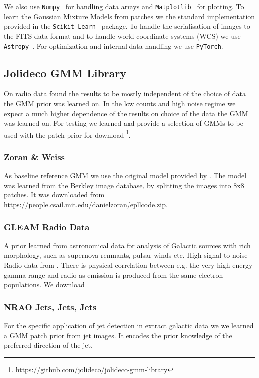 \documentclass[twocolumn]{aastex631}
\begin{document}
    We also use \texttt{Numpy}~\citep{Numpy2020} for handling data arrays and
    \texttt{Matplotlib}~\citep{Hunter2007} for plotting.
    To learn the Gaussian Mixture Models from patches we the standard implementation
    provided in the \texttt{Scikit-Learn}~\citep{Skimage2014} package. To handle the 
    serialisation of images to the FITS data format and to handle world coordinate
    systems (WCS) we use \texttt{Astropy}~\citep{Astropy2018}.
    For optimization and internal data handling we use \texttt{PyTorch}.

    \subsection{Jolideco GMM Library}
    On radio data \cite{Bouman2016} found the results to be mostly independent 
    of the choice of data the GMM prior was learned on. In the low counts and high
    noise regime we expect a much higher dependence of the results on choice of the
    data the GMM was learned on. For testing we learned and provide a selection of GMMs to be used with the patch prior for download \footnote{\url{https://github.com/jolideco/jolideco-gmm-library}}.
    
    \subsubsection{Zoran \& Weiss}
    As baseline reference GMM we use the original model provided by \cite{Zoran2011}. The model was learned
    from the Berkley image database, by splitting the images into 8x8 patches. 
    It was downloaded from \url{https://people.csail.mit.edu/danielzoran/epllcode.zip}.
    
    \subsubsection{GLEAM Radio Data}
    A prior learned from astronomical data for analysis of Galactic sources with 
    rich morphology, such as supernova remnants, pulsar winds etc.
    High signal to noise Radio data from \cite{HurleyWalker2022}.
    There is physical correlation between e.g. the very high energy gamma range
    and radio as emission is produced from the same electron populations.
    We download 

    \subsubsection{NRAO Jets, Jets, Jets}
    For the specific application of jet detection in extract galactic data we we learned a GMM patch prior from jet images. It encodes the prior knowledge of the preferred direction of the jet. 
\end{document}

